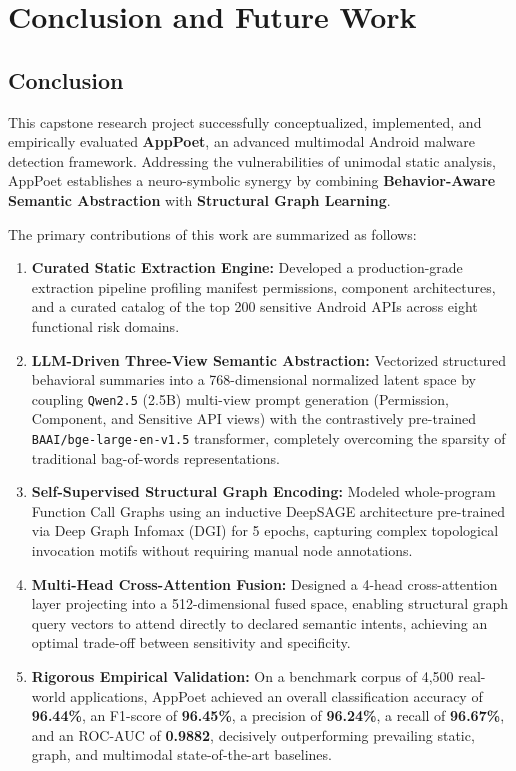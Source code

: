 \documentclass[12pt,a4paper,oneside]{report}
\begin{document}
\clearpage
\chapter{Conclusion and Future Work}
\section{Conclusion}
This capstone research project successfully conceptualized, implemented, and empirically evaluated \textbf{AppPoet}, an advanced multimodal Android malware detection framework. Addressing the vulnerabilities of unimodal static analysis, AppPoet establishes a neuro-symbolic synergy by combining \textbf{Behavior-Aware Semantic Abstraction} with \textbf{Structural Graph Learning}. 

The primary contributions of this work are summarized as follows:
\begin{enumerate}
    \item \textbf{Curated Static Extraction Engine:} Developed a production-grade extraction pipeline profiling manifest permissions, component architectures, and a curated catalog of the top 200 sensitive Android APIs across eight functional risk domains.
    \item \textbf{LLM-Driven Three-View Semantic Abstraction:} Vectorized structured behavioral summaries into a 768-dimensional normalized latent space by coupling \texttt{Qwen2.5} (2.5B) multi-view prompt generation (Permission, Component, and Sensitive API views) with the contrastively pre-trained \texttt{BAAI/bge-large-en-v1.5} transformer, completely overcoming the sparsity of traditional bag-of-words representations.
    \item \textbf{Self-Supervised Structural Graph Encoding:} Modeled whole-program Function Call Graphs using an inductive DeepSAGE architecture pre-trained via Deep Graph Infomax (DGI) for 5 epochs, capturing complex topological invocation motifs without requiring manual node annotations.
    \item \textbf{Multi-Head Cross-Attention Fusion:} Designed a 4-head cross-attention layer projecting into a 512-dimensional fused space, enabling structural graph query vectors to attend directly to declared semantic intents, achieving an optimal trade-off between sensitivity and specificity.
    \item \textbf{Rigorous Empirical Validation:} On a benchmark corpus of 4,500 real-world applications, AppPoet achieved an overall classification accuracy of \textbf{96.44\%}, an F1-score of \textbf{96.45\%}, a precision of \textbf{96.24\%}, a recall of \textbf{96.67\%}, and an ROC-AUC of \textbf{0.9882}, decisively outperforming prevailing static, graph, and multimodal state-of-the-art baselines.
\end{enumerate}
\end{document}

